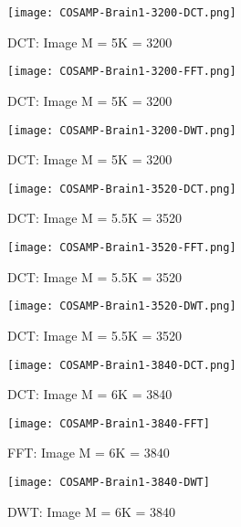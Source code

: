 \documentclass[titlepage,oneside, 12pt]{book}
\theoremstyle{break}
\begin{document}
\begin{figure}[!h]
\centering
{}
  \texttt{[image: COSAMP-Brain1-3200-DCT.png]}
  \caption{DCT: Image M = 5K = 3200}\label{fig:COSAMP-Brain1-3200-DCT}
\endminipage
\hspace*{2em}
  \texttt{[image: COSAMP-Brain1-3200-FFT.png]}
  \caption{DCT: Image M = 5K = 3200}\label{fig:COSAMP-Brain1-3200-FFT}
\endminipage
\hspace*{2em}
  \texttt{[image: COSAMP-Brain1-3200-DWT.png]}
  \caption{DCT: Image M = 5K = 3200}\label{fig:COSAMP-Brain1-3200-DWT}
\endminipage
\hspace*{2em}
\end{figure}

\clearpage
\begin{figure}[!h]
\centering
{}
  \texttt{[image: COSAMP-Brain1-3520-DCT.png]}
  \caption{DCT: Image M = 5.5K = 3520}\label{fig:COSAMP-Brain1-3520-DCT}
\endminipage
\hspace*{2em}
  \texttt{[image: COSAMP-Brain1-3520-FFT.png]}
  \caption{DCT: Image M = 5.5K = 3520}\label{fig:COSAMP-Brain1-3520-FFT}
\endminipage
\hspace*{2em}
  \texttt{[image: COSAMP-Brain1-3520-DWT.png]}
  \caption{DCT: Image M = 5.5K = 3520}\label{fig:COSAMP-Brain1-3520-DWT}
\endminipage
\hspace*{2em}
\end{figure}


\begin{figure}[!h]
\centering
{}
  \texttt{[image: COSAMP-Brain1-3840-DCT.png]}
  \caption{DCT: Image M = 6K = 3840}\label{fig:COSAMP-Brain1-3840-DCT}
\endminipage
\hspace*{2em}
  \texttt{[image: COSAMP-Brain1-3840-FFT]}
  \caption{FFT: Image M = 6K = 3840}\label{fig:COSAMP-Brain1-3840-FFT}
\endminipage
\hspace*{2em}
%
  \texttt{[image: COSAMP-Brain1-3840-DWT]}
  \caption{DWT: Image M = 6K = 3840}\label{fig:COSAMP-Brain1-3840-DWT}
\endminipage
\hspace*{2em}
\end{figure}
\end{document}
